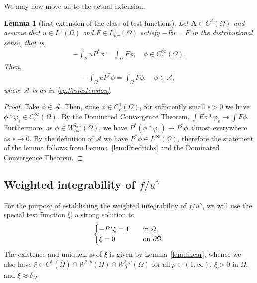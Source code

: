 \documentclass[12pt,a4paper]{amsart}
\newtheorem{lemma}[theorem]{\bf Lemma}
\theoremstyle{definition}
\newcommand{\A}{\mathbf{A}}
\begin{document}
We may now move on to the actual extension.

\begin{lemma}[first extension of the class of test functions]\label{lem:firstextension}
    Let $\A\in C^2(\Omega)$ and assume that $u\in L^1(\Omega)$ and $F\in L^1_{loc}(\Omega)$ satisfy $-Pu = F$ in the distributional sense, that is,
    \begin{align*}
        -\int_\Omega uP^* \phi = \int_\Omega F\phi,\quad \phi \in C^\infty_c(\Omega).
    \end{align*}
    Then,
    \begin{align*}
        -\int_\Omega uP^* \phi = \int_\Omega F\phi,\quad \phi\in \mathcal{A},
    \end{align*}
    where $\mathcal{A}$ is as in \eqref{eq:firstextension}. 
\end{lemma}
\begin{proof}
    Take $\phi\in \mathcal{A}$. Then, since $\phi\in C^1_c(\Omega)$, for sufficiently small $\epsilon>0$ we have $\phi\ast \varphi_\epsilon \in C^\infty_c(\Omega)$. By the Dominated Convergence Theorem, $\int F\phi\ast \varphi_\epsilon \to \int F\phi$. Furthermore, as $\phi\in W^{2,1}_{loc}(\Omega)$, we have $P^*(\phi\ast\varphi_\epsilon) \to P^*\phi$ almost everywhere as $\epsilon\to 0$. By the definition of $\mathcal{A}$ we have $P^*\phi\in L^\infty(\Omega)$, therefore the statement of the lemma follows from Lemma~\ref{lem:Friedrichs} and the Dominated Convergence Theorem.
\end{proof}
\subsection{Weighted integrability of $f/u^\gamma$}\label{sec:weightedintegrability}

For the purpose of establishing the weighted integrability of $f/u^\gamma$, we will use the special test function $\xi$, a strong solution to
\begin{align*}
\begin{cases}
    -P^\ast \xi=1\quad &{\rm in}\ \Omega,\\
    \xi = 0\quad &{\rm on}\ \partial \Omega.
    \end{cases}
\end{align*}
The existence and uniqueness of $\xi$ is given by Lemma~\ref{lem:linear}, whence we also have $\xi\in C^1(\overline{\Omega})\cap W^{2,p}(\Omega)\cap W^{1,p}_0(\Omega)$ for all $p\in (1,\infty)$, $\xi>0$ in $\Omega$, and $\xi \approx \delta_{\Omega}$.  
\end{document}
